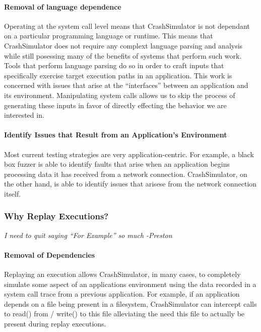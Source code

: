         \paragraph{Removal of language dependence}

        Operating at the system call level means that CrashSimulator is not dependant on a particular programming
        language or runtime.  This means that CrashSimulator does not require any complext language parsing and analysis
        while still posessing many of the benefits of systems that perform such work.  Tools that perform language
        parsing do so in order to craft inputs that specifically exercise target execution paths in an application.
        This work is concerned with issues that arise at the ``interfaces'' between an application and its environment.
        Manipulating system calls allows us to skip the process of generating these inputs in favor of directly
        effecting the behavior we are interested in.

        \paragraph{Identify Issues that Result from an Application's Environment}

        Most current testing strategies are very application-centric.  For example, a black box fuzzer is able to
        identify faults that arise when an application begins processing data it has received from a network
        connection. CrashSimulator, on the other hand, is able to identify issues that arisese from the network connection
        itself.

    \subsubsection{Why Replay Executions?}

    \emph{I need to quit saying ``For Example'' so much -Preston}

    \paragraph{Removal of Dependencies}

    Replaying an execution allows CrashSimulator, in many cases, to completely simulate some aspect of an applications
    environment using the data recorded in a system call trace from a previous application.  For example, if an
    application depends on a file being present in a filesystem, CrashSimulator can intercept calls to read()
    from / write() to this file alleviating the need this file to actually be present during replay executions.

